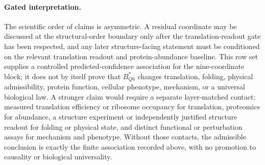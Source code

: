 \paragraph{Gated interpretation.}
The scientific order of claims is asymmetric. A residual coordinate may be discussed at the structural-order boundary only after the translation-readout gate has been respected, and any later structure-facing statement must be conditioned on the relevant translation readout and protein-abundance baseline. This row set supplies a controlled predicted-confidence association for the nine-coordinate block; it does not by itself prove that $B^{\ast}_{Q6}$ changes translation, folding, physical admissibility, protein function, cellular phenotype, mechanism, or a universal biological law. A stronger claim would require a separate layer-matched contact: measured translation efficiency or ribosome occupancy for translation, proteomics for abundance, a structure experiment or independently justified structure readout for folding or physical state, and distinct functional or perturbation assays for mechanism and phenotype. Without those contacts, the admissible conclusion is exactly the finite association recorded above, with no promotion to causality or biological universality.